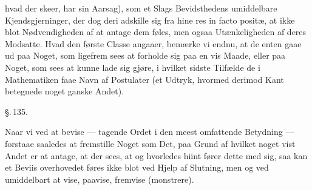 \documentclass[12pt]{book}
\makeatletter
\def\textit#1{#1}%
\def\emph#1{#1}%
\newcommand{\umph}[2][misc]{%
  \@ifundefined{umph@#1@on}{#2}{\emph{#2}}}
\newcommand{\parag}[1]{%
  \par\vspace{0.9\baselineskip}%
  {\centering\textit{\S.\,#1.}\par}%
  \vspace{0.35\baselineskip}%
  \noindent\hspace{\parindent}\ignorespaces
}
\newcommand{\opage}[1]{\marginnote{\footnotesize\textit{[#1]}}}
\makeatother
\begin{document}
\opage{320} hvad der skeer, har sin Aarsag), som et Slags Bevidsthedens umiddelbare
Kjendsgjerninger, der dog deri adskille sig fra hine \textit{res in facto positæ}, at
ikke blot Nødvendigheden af at antage dem føles, men ogsaa Utænkeligheden af deres
Modsatte. Hvad den første Classe angaaer, bemærke vi endnu, at de enten gaae ud paa
Noget, som ligefrem sees at forholde sig paa en vis Maade, eller paa Noget, som sees at
kunne lade sig gjøre, i hvilket sidste Tilfælde de i Mathematiken faae Navn af
Postulater (et Udtryk, hvormed derimod Kant betegnede noget ganske Andet).

\parag{135}

Naar vi ved at bevise --- tagende Ordet i den meest omfattende Betydning --- forstaae
saaledes at fremstille Noget som Det, paa Grund af hvilket noget vist Andet er at
antage, at der sees, at og hvorledes hiint fører dette med sig, saa kan et Beviis
overhovedet føres ikke blot ved Hjelp af Slutning, men og ved umiddelbart at vise,
paavise, fremvise (monstrere).
\end{document}
